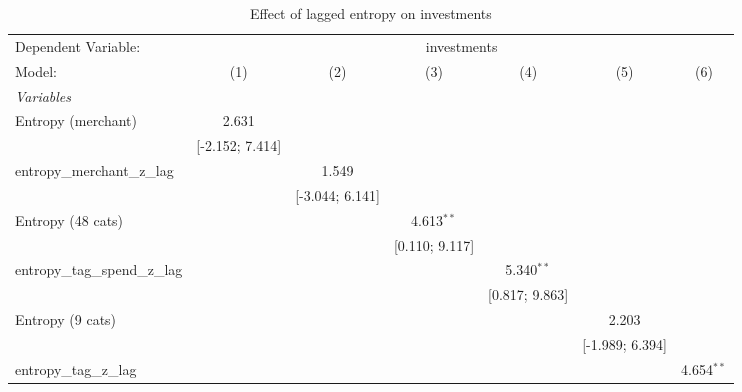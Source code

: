
\begin{table}[htbp]
   \centering
   \tiny
   \begin{threeparttable}[b]
      \caption{\label{tab:reg_investments_lagged_z} Effect of lagged entropy on investments}
      \begin{tabular}{lcccccc}
         \tabularnewline \midrule \midrule
         Dependent Variable: & \multicolumn{6}{c}{investments}\\
         Model:                          & (1)              & (2)              & (3)              & (4)              & (5)              & (6)\\  
         \midrule
         \emph{Variables}\\
         Entropy (merchant)              & 2.631            &                  &                  &                  &                  &   \\   
                                         & [-2.152; 7.414]  &                  &                  &                  &                  &   \\   
         entropy\_merchant\_z\_lag       &                  & 1.549            &                  &                  &                  &   \\   
                                         &                  & [-3.044; 6.141]  &                  &                  &                  &   \\   
         Entropy (48 cats)               &                  &                  & 4.613$^{**}$     &                  &                  &   \\   
                                         &                  &                  & [0.110; 9.117]   &                  &                  &   \\   
         entropy\_tag\_spend\_z\_lag     &                  &                  &                  & 5.340$^{**}$     &                  &   \\   
                                         &                  &                  &                  & [0.817; 9.863]   &                  &   \\   
         Entropy (9 cats)                &                  &                  &                  &                  & 2.203            &   \\   
                                         &                  &                  &                  &                  & [-1.989; 6.394]  &   \\   
         entropy\_tag\_z\_lag            &                  &                  &                  &                  &                  & 4.654$^{**}$\\   

\end{tabular}
\end{threeparttable}
\end{table}

